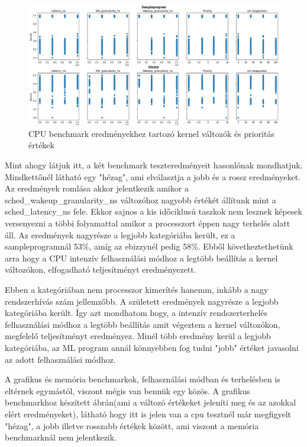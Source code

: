 \begin{figure}[h!]
\centering
\includegraphics[scale=0.35]{images/cpuBenchmarkValues.png}
\caption{CPU benchmark eredményekhez tartozó kernel változók és prioritás értékek}
\label{fig:CpuParameters}
\end{figure}

Mint ahogy látjuk itt, a két benchmark teszteredményeit hasonlónak mondhatjuk. Mindkettőnél látható egy "hézag", ami elválasztja a jobb és a rossz eredményeket. Az eredmények romlása akkor jelentkezik amikor a sched\_wakeup\_granularity\_ns változóhoz nagyobb értékét állítunk mint a sched\_latency\_ns fele. Ekkor sajnos a kis időciklusú taszkok nem lesznek képesek versenyezni a többi folyamattal amikor a processzort éppen nagy terhelés alatt áll.
Az eredmények nagyrésze a legjobb kategóriába került, ez a sampleprogramnál 53\%, amíg az ebizzynél pedig 58\%. Ebből következtethetünk arra hogy a CPU intenzív felhasználási módhoz a legtöbb beállítás a kernel változókon, elfogadható teljesítményt eredményezett.

Ebben a kategóriában nem processzor kimerítés hanemm, inkább a nagy rendszerhívás szám jellemzőbb.
A született eredmények nagyrésze a legjobb kategóriába került. Így azt mondhatom hogy, a intenzív rendszerterhelés felhasználási módhoz a legtöbb beállítás amit végeztem a kernel változókon, megfelelő teljesítményt eredményez. Minél több eredmény kerül a legjobb kategóriába, az ML program annál könnyebben fog tudni "jobb" értéket javasolni az adott felhasználási módhoz.


A grafikus és memória benchmarkok, felhasználási módban és terhelésben is eltérnek egymástól, viszont mégis van bennük egy közös.
A grafikus benchmarkhoz készített ábrán(ami a változó értékeket jeleníti meg és az azokkal elért eredményeket), látható hogy itt is jelen van a cpu tesztnél már megfigyelt "hézag", a jobb illetve rosszabb értékek között, ami viszont a memória benchmarknál nem jelentkezik.

